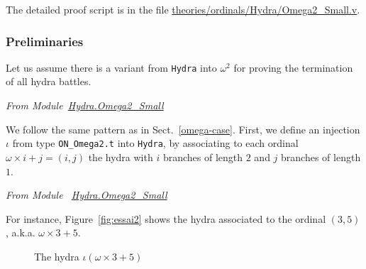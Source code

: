 The detailed  proof script is in the file
\href{https://github.com/coq-community/hydra-battles/blob/master/theories/ordinals/Hydra/Omega2_Small.v}{theories/ordinals/Hydra/Omega2\_Small.v}.

\subsubsection{Preliminaries}
Let us assume there is a variant from \texttt{Hydra} into $\omega^2$  for proving the   termination of all hydra battles.

\vspace{4pt}
\emph{From Module~\href{../theories/html/hydras.Hydra.Omega2_Small.html}{Hydra.Omega2\_Small}}






We  follow the same pattern as in Sect.~\ref{omega-case}.
First, we define an injection $\iota$ from type \texttt{ON\_Omega2.t} into \texttt{Hydra}, by
 associating to  each ordinal $\omega\times i+ j = (i,j)$ the hydra with $i$ branches of length $2$ and
$j$ branches of length $1$.


\vspace{4pt}
\emph{From Module ~\href{../theories/html/hydras.Hydra.Omega2_Small.html\#iota}{Hydra.Omega2\_Small}}




For instance, Figure~\vref{fig:essai2} shows the hydra associated to the ordinal 
$(3,5)$, a.k.a. $\omega\times 3 + 5$.

\begin{figure}[htb]
\centering
{}
\caption{\label{fig:essai2}
The hydra $\iota(\omega\times 3+5)$}
\end{figure}




